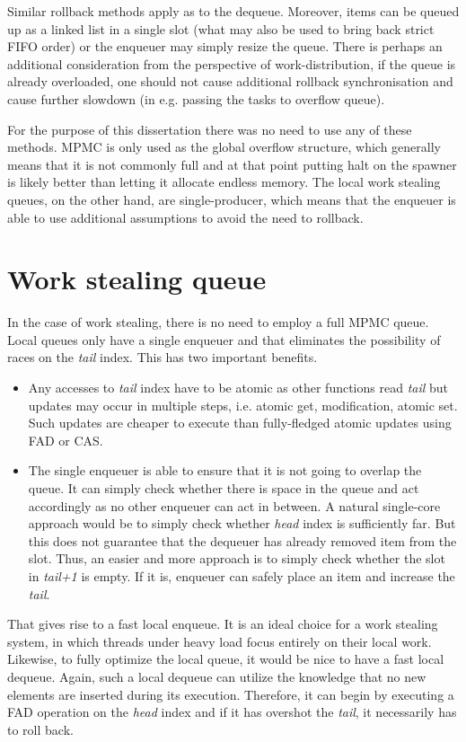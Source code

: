 \documentclass[12pt,a4paper,twoside]{report}
\begin{document}
Similar rollback methods apply as to the dequeue. Moreover, items can be queued up as a linked list in a single slot (what may also be used to bring back strict FIFO order) or the enqueuer may simply resize the queue. There is perhaps an additional consideration from the perspective of work-distribution, if the queue is already overloaded, one should not cause additional rollback synchronisation and cause further slowdown (in e.g. passing the tasks to overflow queue). 

For the purpose of this dissertation there was no need to use any of these methods. MPMC is only used as the global overflow structure, which generally means that it is not commonly full and at that point putting halt on the spawner is likely better than letting it allocate endless memory. The local work stealing queues, on the other hand, are single-producer, which means that the enqueuer is able to use additional assumptions to avoid the need to rollback.

\section{Work stealing queue}
\label{section:wss-queue}

In the case of work stealing, there is no need to employ a full MPMC queue. Local queues only have a single enqueuer and that eliminates the possibility of races on the \textit{tail} index. This has two important benefits.
\begin{itemize}
    \item Any accesses to \textit{tail} index have to be atomic as other functions read \textit{tail} but updates may occur in multiple steps, i.e. atomic get, modification, atomic set. Such updates are cheaper to execute than fully-fledged atomic updates using FAD or CAS. 
    \item The single enqueuer is able to ensure that it is not going to overlap the queue. It can simply check whether there is space in the queue and act accordingly as no other enqueuer can act in between. A natural single-core approach would be to simply check whether \textit{head} index is sufficiently far. But this does not guarantee that the dequeuer has already removed item from the slot. Thus, an easier and more approach is to simply check whether the slot in \textit{tail+1} is empty. If it is, enqueuer can safely place an item and increase the \textit{tail}.
\end{itemize}

That gives rise to a fast local enqueue. It is an ideal choice for a work stealing system, in which threads under heavy load focus entirely on their local work. Likewise, to fully optimize the local queue, it would be nice to have a fast local dequeue. Again, such a local dequeue can utilize the knowledge that no new elements are inserted during its execution. Therefore, it can begin by executing a FAD operation on the \textit{head} index and if it has overshot the \textit{tail}, it necessarily has to roll back. 
\end{document}
